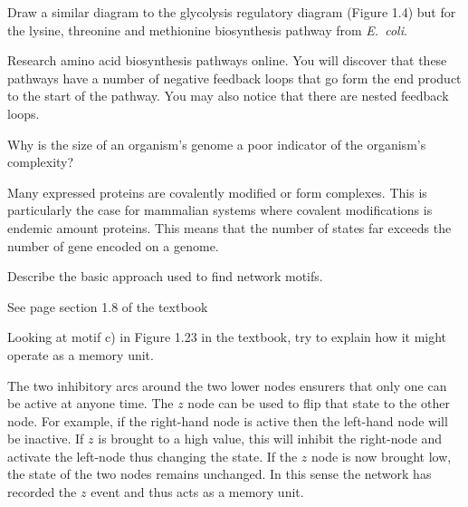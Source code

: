 \documentclass[12pt]{article}
\begin{document}
\begin{question}
Draw a similar diagram to the glycolysis regulatory diagram (Figure 1.4) but for the lysine, threonine and methionine biosynthesis pathway from {\em E.\ coli}.
\end{question}
\begin{solution}
Research amino acid biosynthesis pathways online. You will discover that these pathways have a number of negative feedback loops that go form the end product to the start of the pathway. You may also notice that there are nested feedback loops.
\end{solution}


\begin{question}
Why is the size of an organism's genome a poor indicator of the organism's complexity?
\end{question}
\begin{solution}
Many expressed proteins are covalently modified or form complexes. This is particularly the case for mammalian systems where covalent modifications is endemic amount proteins. This means that the number of states far exceeds the number of gene encoded on a genome.
\end{solution}


\begin{question}
Describe the basic approach used to find network motifs.
\end{question}
\begin{solution}
See page section 1.8 of the textbook
\end{solution}


\begin{question}
Looking at motif c) in Figure 1.23 in the textbook, try to explain how it might operate as a memory unit.
\end{question}
\begin{solution}
The two inhibitory arcs around the two lower nodes ensurers that only one can be active at anyone time. The $z$ node can be used to flip that state to the other node. For example, if the right-hand node is active then the left-hand node will be inactive. If $z$ is brought to a high value, this will inhibit the right-node and activate the left-node thus changing the state. If the $z$ node is now brought low, the state of the two nodes remains unchanged. In this sense the network has recorded the $z$ event and thus acts as a memory unit.
\end{solution}
\end{document}
